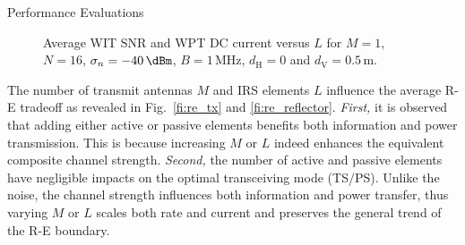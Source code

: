 \documentclass[journal]{IEEEtran}
\begin{document}
\begin{section}{Performance Evaluations}
		\begin{figure}[!t]
			\centering
			\begin{adjustbox}{width=0.9\columnwidth}
				
			\end{adjustbox}
			\caption{Average WIT SNR and WPT DC current versus $L$ for $M=1$, $N=16$, $\sigma_n=-40\,\si{\dBm}$, $B=1\,\si{\MHz}$, $d_{\mathrm{H}}=0$ and $d_{\mathrm{V}}=0.5\,\si{\meter}$.}
			\label{fi:scaling_reflector}
		\end{figure}

		The number of transmit antennas $M$ and IRS elements $L$ influence the average R-E tradeoff as revealed in Fig.~\ref{fi:re_tx} and \ref{fi:re_reflector}. \textit{First,} it is observed that adding either active or passive elements benefits both information and power transmission. This is because increasing $M$ or $L$ indeed enhances the equivalent composite channel strength. \textit{Second,} the number of active and passive elements have negligible impacts on the optimal transceiving mode (TS/PS). Unlike the noise, the channel strength influences both information and power transfer, thus varying $M$ or $L$ scales both rate and current and preserves the general trend of the R-E boundary.

\end{section}
\end{document}
